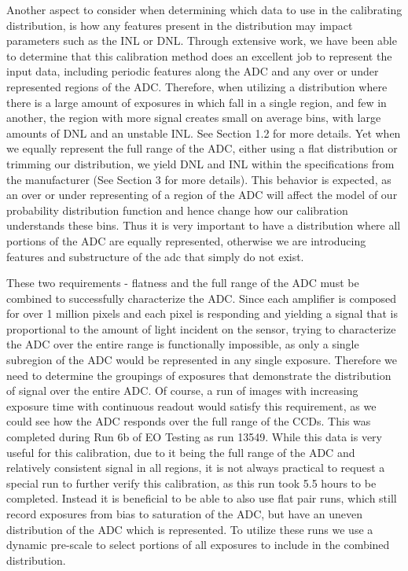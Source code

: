 \documentclass[11pt, letterpaper]{article}
\begin{document}
Another aspect to consider when determining which data to use in the calibrating distribution, is how any features present in the distribution may impact parameters such as the INL or DNL. 
Through extensive work, we have been able to determine that this calibration method does an excellent job to represent the input data, including periodic features along the ADC and any over or under represented regions of the ADC. 
Therefore, when utilizing a distribution where there is a large amount of exposures in which fall in a single region, and few in another, the region with more signal creates small on average bins, with large amounts of DNL and an unstable INL. 
See Section 1.2 for more details. 
Yet when we equally represent the full range of the ADC, either using a flat distribution or trimming our distribution, we yield DNL and INL within the specifications from the manufacturer (See Section 3 for more details). 
This behavior is expected, as an over or under representing of a region of the ADC will affect the model of our probability distribution function and hence change how our calibration understands these bins. 
Thus it is very important to have a distribution where all portions of the ADC are equally represented, otherwise we are introducing features and substructure of the adc that simply do not exist. 
\indent 


These two requirements - flatness and the full range of the ADC must be combined to successfully characterize the ADC. 
Since each amplifier is composed for over 1 million pixels and each pixel is responding and yielding a signal that is proportional to the amount of light incident on the sensor, trying to characterize the ADC over the entire range is functionally impossible, as only a single subregion of the ADC would be represented in any single exposure. 
Therefore we need to determine the groupings of exposures that demonstrate the distribution of signal over the entire ADC. 
Of course, a run of images with increasing exposure time with continuous readout would satisfy this requirement, as we could see how the ADC responds over the full range of the CCDs. 
This was completed during Run 6b of EO Testing as run 13549. 
While this data is very useful for this calibration, due to it being the full range of the ADC and relatively consistent signal in all regions, it is not always practical to request a special run to further verify this calibration, as this run took 5.5 hours to be completed.
Instead it is beneficial to be able to also use flat pair runs, which still record exposures from bias to saturation of the ADC, but have an uneven distribution of the ADC which is represented. 
To utilize these runs we use a dynamic pre-scale to select portions of all exposures to include in the combined distribution. 
\indent
\end{document}

